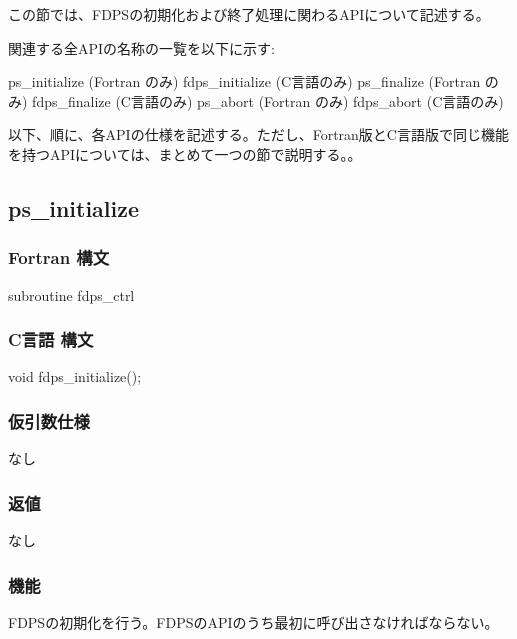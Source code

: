 この節では、FDPSの初期化および終了処理に関わるAPIについて記述する。

関連する全APIの名称の一覧を以下に示す:
\begin{screen}
\begin{spverbatim}
ps_initialize (Fortran のみ)
fdps_initialize (C言語のみ)
ps_finalize (Fortran のみ)
fdps_finalize (C言語のみ)
ps_abort (Fortran のみ)
fdps_abort (C言語のみ)
\end{spverbatim}
\end{screen}

以下、順に、各APIの仕様を記述する。ただし、Fortran版とC言語版で同じ機能を持つAPIについては、まとめて一つの節で説明する。{\setnoko{}}。

\clearpage


\subsection{ps\_initialize}
\subsubsection*{Fortran 構文}
\begin{screen}
\begin{spverbatim}
subroutine fdps_ctrl%
\end{spverbatim}
\end{screen}

\subsubsection*{C言語 構文}
\begin{screen}
\begin{spverbatim}
void fdps_initialize();
\end{spverbatim}
\end{screen}

\subsubsection*{仮引数仕様} 
なし
\subsubsection*{返値}
なし
\subsubsection*{機能}
FDPSの初期化を行う。FDPSのAPIのうち最初に呼び出さなければならない。
\clearpage


